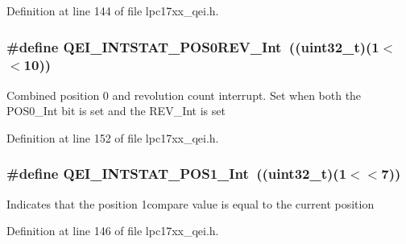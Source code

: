 \-Definition at line 144 of file lpc17xx\-\_\-qei.\-h.

\hypertarget{group___q_e_i___private___macros_ga781169ca017eb10d8aa51f36923242b8}{
\subsubsection[{\-Q\-E\-I\-\_\-\-I\-N\-T\-S\-T\-A\-T\-\_\-\-P\-O\-S0\-R\-E\-V\-\_\-\-Int}]{\setlength{\rightskip}{0pt plus 5cm}\#define {\bf \-Q\-E\-I\-\_\-\-I\-N\-T\-S\-T\-A\-T\-\_\-\-P\-O\-S0\-R\-E\-V\-\_\-\-Int}~((uint32\-\_\-t)(1$<$$<$10))}}\label{group___q_e_i___private___macros_ga781169ca017eb10d8aa51f36923242b8}
\-Combined position 0 and revolution count interrupt. \-Set when both the \-P\-O\-S0\-\_\-\-Int bit is set and the \-R\-E\-V\-\_\-\-Int is set 

\-Definition at line 152 of file lpc17xx\-\_\-qei.\-h.

\hypertarget{group___q_e_i___private___macros_ga637dc38b5288e83e06df77fd151d05e0}{
\subsubsection[{\-Q\-E\-I\-\_\-\-I\-N\-T\-S\-T\-A\-T\-\_\-\-P\-O\-S1\-\_\-\-Int}]{\setlength{\rightskip}{0pt plus 5cm}\#define {\bf \-Q\-E\-I\-\_\-\-I\-N\-T\-S\-T\-A\-T\-\_\-\-P\-O\-S1\-\_\-\-Int}~((uint32\-\_\-t)(1$<$$<$7))}}\label{group___q_e_i___private___macros_ga637dc38b5288e83e06df77fd151d05e0}
\-Indicates that the position 1compare value is equal to the current position 

\-Definition at line 146 of file lpc17xx\-\_\-qei.\-h.


